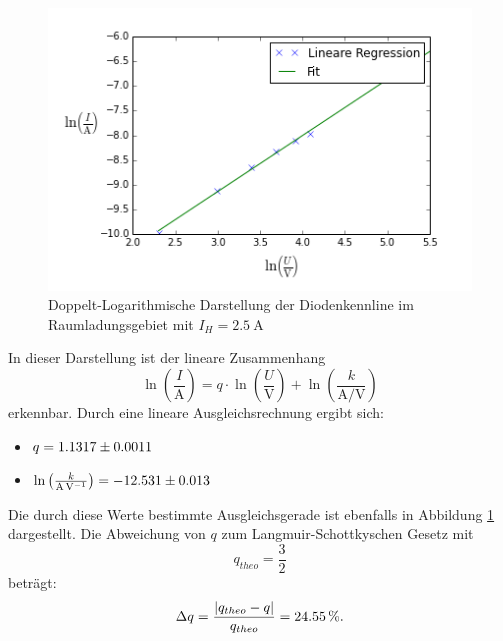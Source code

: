 \documentclass[11pt,ngerman,a4paper]{article}
\begin{document}
\begin{figure}[htp]
\centering
\includegraphics[scale=0.80]{plot_b.png}
\caption{Doppelt-Logarithmische Darstellung der Diodenkennline im Raumladungsgebiet mit $I_H = \SI{2.5}{\ampere}$}
\label{plot_b}
\end{figure}

\noindent
In dieser Darstellung ist der lineare Zusammenhang
\[
\ln\left(\frac{I}{\si{\ampere}}\right) = q\cdot \ln\left(\frac{U}{\si{\volt}}\right)+ \ln\left(\frac{k}{\si{\ampere\per\volt}}\right)
\]
erkennbar. Durch eine lineare Ausgleichsrechnung ergibt sich:
\begin{itemize}
\item $q = \num{1.1317+-0.0011}$
\item $\ln\left(\frac{k}{\si{\ampere\per\volt}}\right) = \num{-12.531+-0.013}$ 
\end{itemize}
Die durch diese Werte bestimmte Ausgleichsgerade ist ebenfalls in Abbildung \ref{plot_b} dargestellt.
Die Abweichung von $q$ zum Langmuir-Schottkyschen Gesetz mit 
\[
q_{theo} = \frac32
\]
beträgt:
\[
\Delta q = \frac{|q_{theo}-q|}{q_{theo}} = \SI{24.55}{\percent}\rm.
\]
\end{document}
